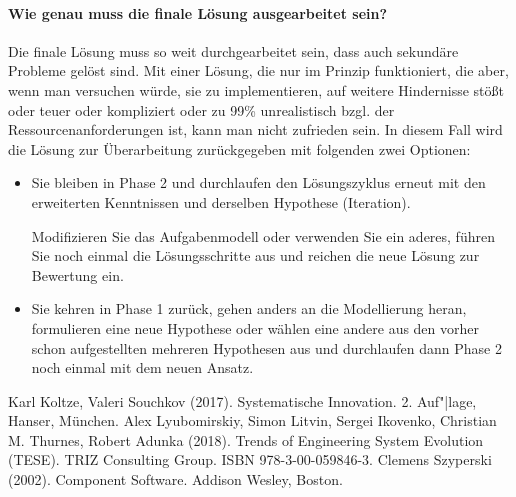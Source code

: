 \documentclass[11pt,a4paper]{article}
\begin{document}
\paragraph{Wie genau muss die finale Lösung ausgearbeitet sein?}
Die finale Lösung muss so weit durchgearbeitet sein, dass auch sekundäre
Probleme gelöst sind.  Mit einer Lösung, die nur im Prinzip funktioniert, die
aber, wenn man versuchen würde, sie zu implementieren, auf weitere Hindernisse
stößt oder teuer oder kompliziert oder zu 99\% unrealistisch bzgl. der
Ressourcenanforderungen ist, kann man nicht zufrieden sein.  In diesem Fall
wird die Lösung zur Überarbeitung zurückgegeben mit folgenden zwei Optionen:
\begin{itemize}
\item Sie bleiben in Phase 2 und durchlaufen den Lösungszyklus erneut mit den
  erweiterten Kenntnissen und derselben Hypothese (Iteration).
  
  Modifizieren Sie das Aufgabenmodell oder verwenden Sie ein aderes, führen
  Sie noch einmal die Lösungsschritte aus und reichen die neue Lösung zur
  Bewertung ein.
\item Sie kehren in Phase 1 zurück, gehen anders an die Modellierung heran,
  formulieren eine neue Hypothese oder wählen eine andere aus den vorher
  schon aufgestellten mehreren Hypothesen aus und durchlaufen dann Phase 2
  noch einmal mit dem neuen  Ansatz.
\end{itemize}


\begin{thebibliography}{xxx}
 Karl Koltze, Valeri Souchkov (2017). Systematische
  Innovation.  2. Auf"|lage, Hanser, München.  
 Alex Lyubomirskiy, Simon Litvin, Sergei Ikovenko, Christian
  M. Thurnes, Robert Adunka (2018). Trends of Engineering System Evolution
  (TESE).  TRIZ Consulting Group. ISBN 978-3-00-059846-3.
 Clemens Szyperski (2002). Component Software. Addison
  Wesley, Boston. 
\end{thebibliography}
\end{document}

